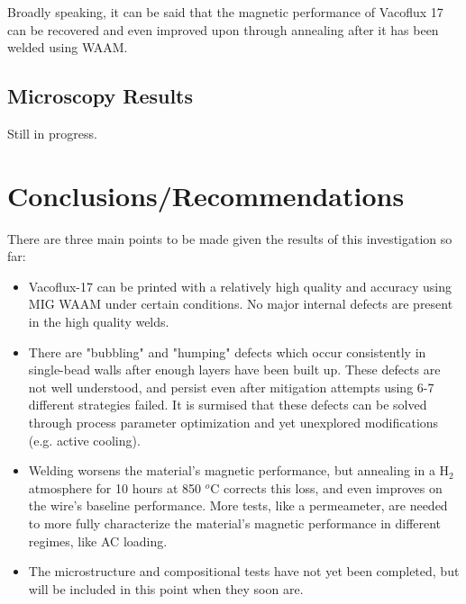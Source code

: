 Broadly speaking, it can be said that the magnetic performance of Vacoflux 17 can be recovered and even improved upon through annealing after it has been welded using WAAM.

\subsection{Microscopy Results}

Still in progress.\section{Conclusions/Recommendations}

There are three main points to be made given the results of this investigation so far:

\begin{itemize}
    \item Vacoflux-17 can be printed with a relatively high quality and accuracy using MIG WAAM under certain conditions. No major internal defects are present in the high quality welds.
    \item There are "bubbling" and "humping" defects which occur consistently in single-bead walls after enough layers have been built up. These defects are not well understood, and persist even after mitigation attempts using 6-7 different strategies failed. It is surmised that these defects can be solved through process parameter optimization and yet unexplored modifications (e.g. active cooling).
    \item Welding worsens the material's magnetic performance, but annealing in a H$_2$ atmosphere for 10 hours at 850 $^o$C corrects this loss, and even improves on the wire's baseline performance. More tests, like a permeameter, are needed to more fully characterize the material's magnetic performance in different regimes, like AC loading.
    \item The microstructure and compositional tests have not yet been completed, but will be included in this point when they soon are.
\end{itemize}
